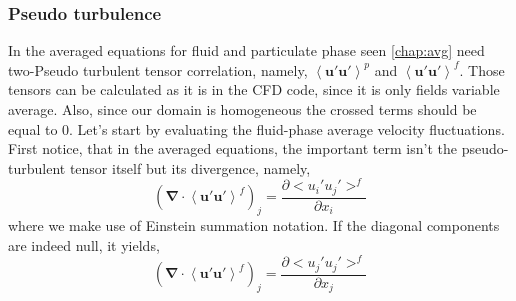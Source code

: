 \subsubsection{Pseudo turbulence}
In the averaged equations for fluid and particulate phase seen \ref{chap:avg} need two-Pseudo turbulent tensor correlation,
namely, $\left<\bm{u'u'}\right>^p$ and $\left<\bm{u'u'}\right>^f$. 
Those tensors can be calculated as it is in the CFD code, since it is only fields variable average. 
Also, since our domain is homogeneous the crossed terms should be equal to 0.
Let's start by evaluating the fluid-phase average velocity fluctuations.
First notice, that in the averaged equations, the important term isn't the pseudo-turbulent tensor itself but its divergence, namely,
\begin{equation*}    
    \left(\bm{\nabla} \cdot \left<\bm{u}'\bm{u}'\right>^f \right)_j = \frac{\partial <u_i' u_j'>^f}{\partial x_i}
\end{equation*}
where we make use of Einstein summation notation.
If the diagonal components are indeed null, it yields,
\begin{equation*}    
    \left(\bm{\nabla} \cdot \left<\bm{u}'\bm{u}'\right>^f \right)_j = \frac{\partial <u_j' u_j'>^f}{\partial x_j}
\end{equation*}
